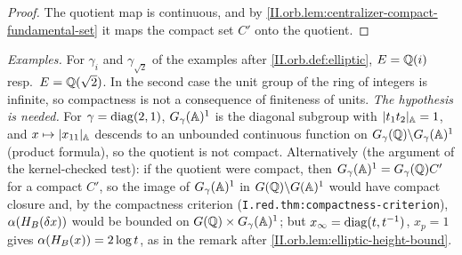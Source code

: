 \begin{theorem}
\end{theorem}
\begin{proof}
The quotient map is continuous, and by \cref{II.orb.lem:centralizer-compact-fundamental-set} it maps the compact set $C'$ onto the quotient.
\end{proof}
\noindent \emph{Examples.} For $\gamma_i$ and $\gamma_{\sqrt2}$ of the examples after \cref{II.orb.def:elliptic}, $E=\mathbb{Q}(i)$ resp.\ $E=\mathbb{Q}(\sqrt2)$. In the
second case the unit group of the ring of integers is infinite, so compactness is not a consequence of finiteness of units.
\emph{The hypothesis is needed.} For $\gamma=\operatorname{diag}(2,1)$, $G_\gamma(\mathbb{A})^1$ is the diagonal subgroup with $\lvert t_1t_2\rvert_{\mathbb{A}}=1$, and $x\mapsto\lvert x_{11}\rvert_{\mathbb{A}}$
descends to an unbounded continuous function on $G_\gamma(\mathbb{Q})\backslash G_\gamma(\mathbb{A})^1$ (product formula), so the quotient is not compact.
Alternatively (the argument of the kernel-checked test): if the quotient were compact, then $G_\gamma(\mathbb{A})^1=G_\gamma(\mathbb{Q})C'$ for a compact $C'$, so the
image of $G_\gamma(\mathbb{A})^1$ in $G(\mathbb{Q})\backslash G(\mathbb{A})^1$ would have compact closure and, by the compactness criterion
(\texttt{I.red.thm:compactness-criterion}), $\alpha(H_B(\delta x))$ would be bounded on $G(\mathbb{Q})\times G_\gamma(\mathbb{A})^1$; but $x_\infty=\operatorname{diag}(t,t^{-1})$, $x_p=1$
gives $\alpha(H_B(x))=2\log t$, as in the remark after \cref{II.orb.lem:elliptic-height-bound}.

